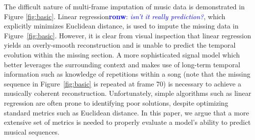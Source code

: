 \documentclass{article}
\newcommand{\FIXME}[2][FIXME]{\textcolor{blue}{\textbf{#1}: \emph{#2}}}
\begin{document}

The difficult nature of multi-frame imputation of music data is
demonstrated in Figure \ref{fig:basic}.
%
Linear regression\FIXME[ronw]{isn't it really prediction?}, which explicitly
minimizes Euclidean distance, is used to impute the missing data in
Figure~\ref{fig:basic}.  However, it is clear from visual inspection
that linear regression yields an overly-smooth reconstruction and is
unable to predict the temporal evolution within the missing section.
%
A more sophisticated signal model which better leverages the
surrounding context and makes use of long-term temporal information
such as knowledge of repetitions within a song (note that the
missing sequence in Figure~\ref{fig:basic} is repeated at frame 70) is necessary to achieve a musically
coherent reconstruction.
%
Unfortunately, simple algorithms such as linear regression
are often prone to identifying poor solutions, despite optimizing standard
metrics such as Euclidean distance.
%
In this paper, we argue that a more extensive set of metrics is needed
to properly evaluate a model's ability to predict musical sequences.
\end{document}
